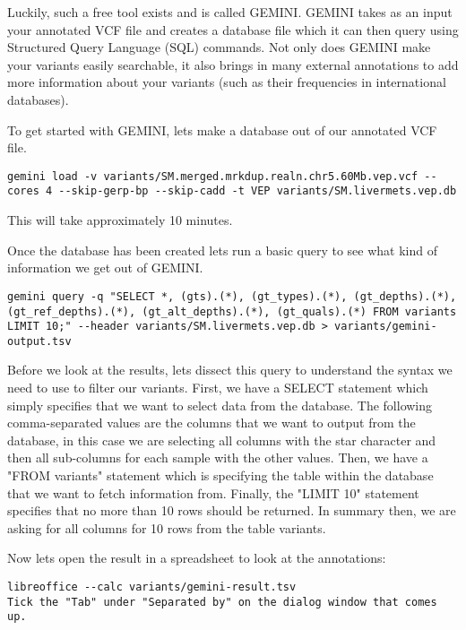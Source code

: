 Luckily, such a free tool exists and is called GEMINI. GEMINI takes as an input your annotated VCF file and creates a database file which it can then query using Structured Query Language (SQL) commands. Not only does GEMINI make your variants easily searchable, it also brings in many external annotations to add more information about your variants (such as their frequencies in international databases).

\begin{steps}
To get started with GEMINI, lets make a database out of our annotated VCF file.
\begin{lstlisting}
gemini load -v variants/SM.merged.mrkdup.realn.chr5.60Mb.vep.vcf --cores 4 --skip-gerp-bp --skip-cadd -t VEP variants/SM.livermets.vep.db
\end{lstlisting}
\end{steps}

This will take approximately 10 minutes.

Once the database has been created lets run a basic query to see what kind of information we get out of GEMINI.

\begin{steps}
\begin{lstlisting}
gemini query -q "SELECT *, (gts).(*), (gt_types).(*), (gt_depths).(*), (gt_ref_depths).(*), (gt_alt_depths).(*), (gt_quals).(*) FROM variants LIMIT 10;" --header variants/SM.livermets.vep.db > variants/gemini-output.tsv
\end{lstlisting}
\end{steps}

Before we look at the results, lets dissect this query to understand the syntax we need to use to filter our variants. First, we have a SELECT statement which simply specifies that we want to select data from the database. The following comma-separated values are the columns that we want to output from the database, in this case we are selecting all columns with the star character and then all sub-columns for each sample with the other values. Then, we have a "FROM variants" statement which is specifying the table within the database that we want to fetch information from. Finally, the "LIMIT 10" statement specifies that no more than 10 rows should be returned. In summary then, we are asking for all columns for 10 rows from the table variants.

\begin{steps}
Now lets open the result in a spreadsheet to look at the annotations:
\begin{lstlisting}
libreoffice --calc variants/gemini-result.tsv
Tick the "Tab" under "Separated by" on the dialog window that comes up.
\end{lstlisting}
\end{steps}

